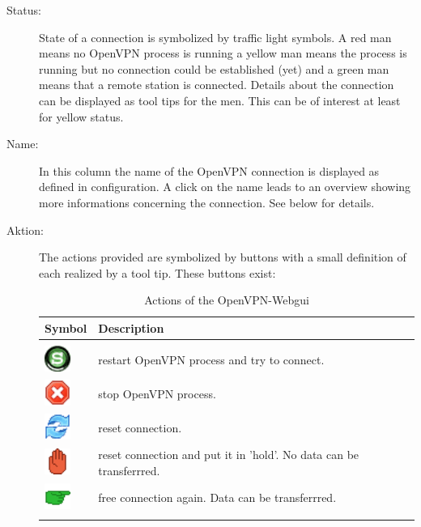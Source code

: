 \begin{description}
\item [Status:] State of a connection is symbolized by traffic light symbols. 
  A red man means no OpenVPN process is running a yellow man means  the 
  process is running but no connection could be established (yet) and a 
  green man means that a remote station is \glqq{}connected\grqq{}.
  Details about the connection can be displayed as tool tips for the men. 
  This can be of interest at least for \glqq{}yellow\grqq{} status.
  
\item [Name:] In this column the name of the OpenVPN connection is displayed 
  as defined in configuration. A click on the name leads to an overview showing 
  more informations concerning the connection. See below for details.

\item [Aktion:] The actions provided are symbolized by buttons with a small 
  definition of each realized by a tool tip. These buttons exist:

  \begin{table}[!h]
    \begin{tabular}{lp{12cm}}
      Symbol                                         & Description \\
      \hline\\
      \includegraphics[width=24pt]{start}            & restart OpenVPN process and try to connect.\\
      \includegraphics[width=24pt]{stop}             & stop OpenVPN process. \\
      \includegraphics[width=24pt]{reload}           & reset connection. \\
      \includegraphics[width=24pt]{hold}             & reset connection and put it in 'hold'. No data can be transferrred. \\
      \includegraphics[width=24pt]{release}          & free connection again. Data can be transferrred. \\
      \hline\\
    \end{tabular}
  \caption{Actions of the OpenVPN-Webgui}
\end{table}
\end{description} 


